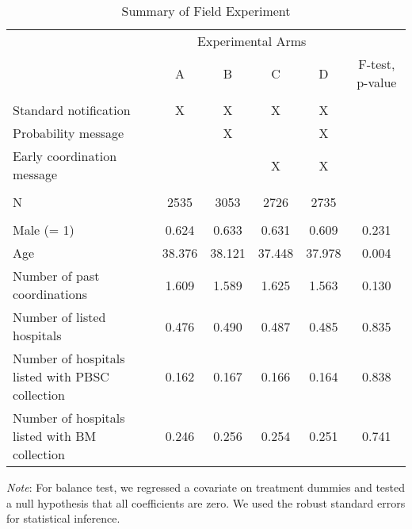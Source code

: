 \documentclass[12pt, a4paper]{article}
\begin{document}
\begin{table}

\caption{\label{tab:summary}Summary of Field Experiment}
\centering
\fontsize{9}{11}\selectfont
\begin{threeparttable}
\begin{tabular}[t]{lccccc}
\toprule
\multicolumn{1}{c}{ } & \multicolumn{4}{c}{Experimental Arms} & \multicolumn{1}{c}{ } \\
\cmidrule(l{3pt}r{3pt}){2-5}
 & A & B & C & D & F-test, p-value\\
\midrule
\addlinespace[0.3em]
\multicolumn{6}{l}{\textbf{A. Interventions}}\\
\hspace{1em}Standard notification & X & X & X & X & \\
\hspace{1em}Probability message &  & X &  & X & \\
\hspace{1em}Early coordination message &  &  & X & X & \\
\addlinespace[0.3em]
\multicolumn{6}{l}{\textbf{B. Sample Size}}\\
\hspace{1em}N & 2535 & 3053 & 2726 & 2735 & \\
\addlinespace[0.3em]
\multicolumn{6}{l}{\textbf{C. Balance Test}}\\
\hspace{1em}Male (= 1) & 0.624 & 0.633 & 0.631 & 0.609 & 0.231\\
\hspace{1em}Age & 38.376 & 38.121 & 37.448 & 37.978 & 0.004\\
\hspace{1em}Number of past coordinations & 1.609 & 1.589 & 1.625 & 1.563 & 0.130\\
\hspace{1em}Number of listed hospitals & 0.476 & 0.490 & 0.487 & 0.485 & 0.835\\
\hspace{1em}Number of hospitals listed with PBSC collection & 0.162 & 0.167 & 0.166 & 0.164 & 0.838\\
\hspace{1em}Number of hospitals listed with BM collection & 0.246 & 0.256 & 0.254 & 0.251 & 0.741\\
\bottomrule
\end{tabular}
\begin{tablenotes}
\item \emph{Note}: For balance test, we regressed a covariate on treatment dummies and tested a null hypothesis that all coefficients are zero. We used the robust standard errors for statistical inference.
\end{tablenotes}
\end{threeparttable}
\end{table}
\end{document}
